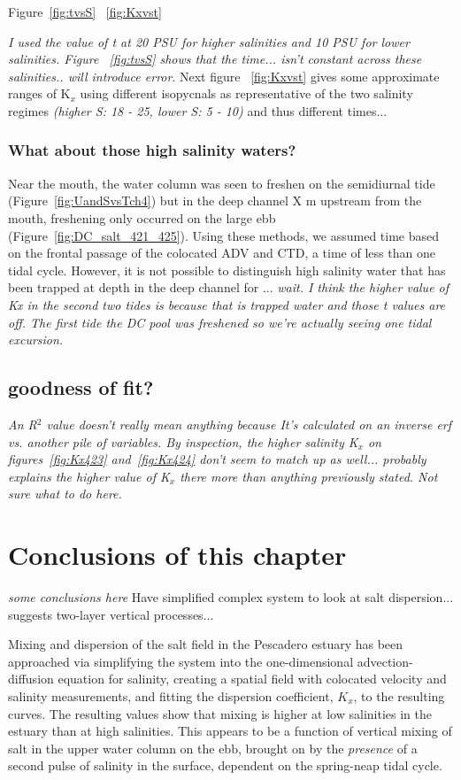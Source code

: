 Figure~\ref{fig:tvsS} ~\ref{fig:Kxvst}

\emph{I used the value of t at 20 PSU for higher salinities and 10 PSU for lower salinities.  Figure ~\ref{fig:tvsS} shows that the time... isn't constant across these salinities.. will introduce error}.  Next figure ~\ref{fig:Kxvst} gives some approximate ranges of K$_x$ using different isopycnals as representative of the two salinity regimes \emph{(higher S: 18 - 25, lower S: 5 - 10)} and thus different times... 


\subsubsection{What about those high salinity waters?}
Near the mouth, the water column was seen to freshen on the semidiurnal tide (Figure~\ref{fig:UandSvsTch4}) but in the deep channel X m upstream from the mouth, freshening only occurred on the large ebb (Figure~\ref{fig:DC_salt_421_425}). Using these methods, we assumed time based on the frontal passage of the colocated ADV and CTD, a time of less than one tidal cycle. However, it is not possible to distinguish high salinity water that has been trapped at depth in the deep channel for ... \emph{wait. I think the higher value of Kx in the second two tides is because that is trapped water and those t values are off. The first tide the DC pool was freshened so we're actually seeing one tidal excursion.}

\subsection{goodness of fit?}
\emph{An R$^2$ value doesn't really mean anything because It's calculated on an inverse erf vs. another pile of variables. By inspection, the higher salinity K$_x$ on figures~\ref{fig:Kx423} and~\ref{fig:Kx424} don't seem to match up as well... probably explains the higher value of K$_x$ there more than anything previously stated. Not sure what to do here.}

\section{Conclusions of this chapter}
\emph{some conclusions here}
Have simplified complex system to look at salt dispersion... suggests two-layer vertical processes... 

Mixing and dispersion of the salt field in the Pescadero estuary has been approached via simplifying the system into the one-dimensional advection-diffusion equation for salinity, creating a spatial field with colocated velocity and salinity measurements, and fitting the dispersion coefficient, $K_x$, to the resulting curves. The resulting values show that mixing is higher at low salinities in the estuary than at high salinities. This appears to be a function of vertical mixing of salt in the upper water column on the ebb, brought on by the \emph{presence} of a second pulse of salinity in the surface, dependent on the spring-neap tidal cycle.  


